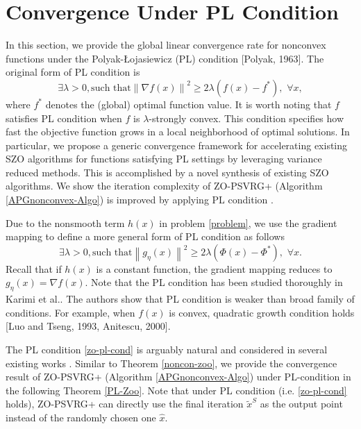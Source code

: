 \documentclass{article}
\newcommand{\norm}[1]{\left\lVert#1\right\rVert}
\theoremstyle{definition}
\theoremstyle{remark}
\begin{document}
\section{Convergence Under PL Condition}
{\color{Violet} In this section, we provide the global linear convergence rate for nonconvex functions under the Polyak-Łojasiewicz
(PL) condition [Polyak, 1963].}
The original form of PL condition is
\begin{equation}
\exists \lambda >0, \text{such~that} \norm{\nabla f(x)}^2 \geq 2\lambda (f(x) - f^*),\,\, \forall x,
\end{equation}
where $f^*$ denotes the (global) optimal function value. It is worth noting that $f$ satisfies PL condition when $f$ is $\lambda$-strongly convex.
{\color{RubineRed}
This condition specifies how fast the objective function grows in a local neighborhood of optimal solutions.
}
{\color{RubineRed}
In particular, we propose a generic convergence framework for accelerating existing SZO algorithms for functions satisfying PL settings by leveraging variance reduced methods. This
is accomplished by a novel synthesis of existing SZO algorithms.
}{\color{Brown} We show the iteration complexity of ZO-PSVRG+ (Algorithm \ref{APGnonconvex-Algo}) is improved by applying PL condition .}



Due to the nonsmooth term $h(x)$ in problem \eqref{problem}, we use the gradient mapping to define a more general form of PL condition as follows
\begin{equation}\label{zo-pl-cond}
\exists \lambda >0, \text{such~that} \norm{g_{\eta}(x)}^2 \geq 2\lambda (\Phi(x) - \Phi^*),\,\, \forall x.
\end{equation}
Recall that if $h(x)$ is a constant function, the gradient mapping reduces to $g_{\eta}(x) = \nabla f(x)$.
{\color{RubineRed}
Note that the PL condition has been studied thoroughly in Karimi et al.. The authors show that PL condition is weaker than broad family of  conditions. For example, when $f(x)$ is convex,  quadratic growth condition holds [Luo and Tseng,
1993, Anitescu, 2000]. 
}

The PL condition \eqref{zo-pl-cond} is arguably natural and considered in several existing works \cite{}.
{\color{Violet}
Similar to Theorem \ref{noncon-zoo}, we provide the convergence result of ZO-PSVRG+ (Algorithm \ref{APGnonconvex-Algo}) under PL-condition in the
following Theorem \ref{PL-Zoo}. Note that under PL condition (i.e. \eqref{zo-pl-cond} holds), ZO-PSVRG+ can directly use the final iteration $\widetilde{x}^S$
as the output point instead of the randomly chosen
one $\hat{x}$. 
}
\end{document}

